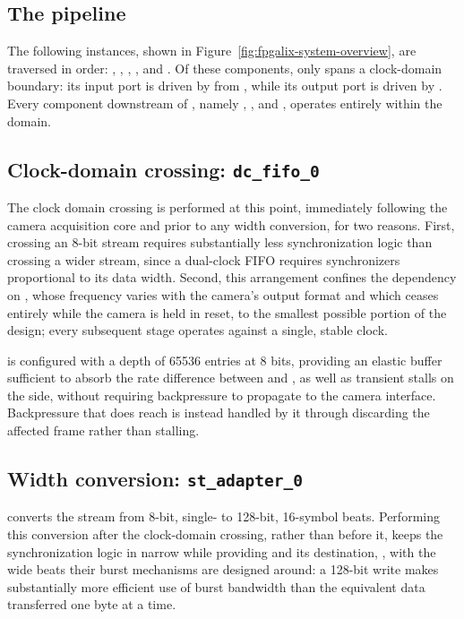 \subsection{The pipeline}

The following  instances, shown in Figure~\ref{fig:fpgalix-system-overview}, are traversed in order: , , , , and . Of these components, only  spans a clock-domain boundary: its  input port is driven by  from , while its  output port is driven by . Every component downstream of , namely , , and , operates entirely within the  domain.

\subsection{Clock-domain crossing: \texttt{dc\_fifo\_0}}

The clock domain crossing is performed at this point, immediately following the camera acquisition core and prior to any width conversion, for two reasons. First, crossing an 8-bit stream requires substantially less synchronization logic than crossing a wider stream, since a dual-clock FIFO requires synchronizers proportional to its data width. Second, this arrangement confines the dependency on , whose frequency varies with the camera's output format and which ceases entirely while the camera is held in reset, to the smallest possible portion of the design; every subsequent stage operates against a single, stable clock.

 is configured with a depth of 65536 entries at 8 bits, providing an elastic buffer sufficient to absorb the rate difference between  and , as well as transient stalls on the  side, without requiring backpressure to propagate to the camera interface. Backpressure that does reach  is instead handled by it through discarding the affected frame rather than stalling.

\subsection{Width conversion: \texttt{st\_adapter\_0}}
\label{subsec:fpgalix-st-adapter}

 converts the stream from 8-bit, single-  to 128-bit, 16-symbol beats. Performing this conversion after the clock-domain crossing, rather than before it, keeps the synchronization logic in  narrow while providing  and its destination,  , with the wide beats their burst mechanisms are designed around: a 128-bit  write makes substantially more efficient use of  burst bandwidth than the equivalent data transferred one byte at a time.

